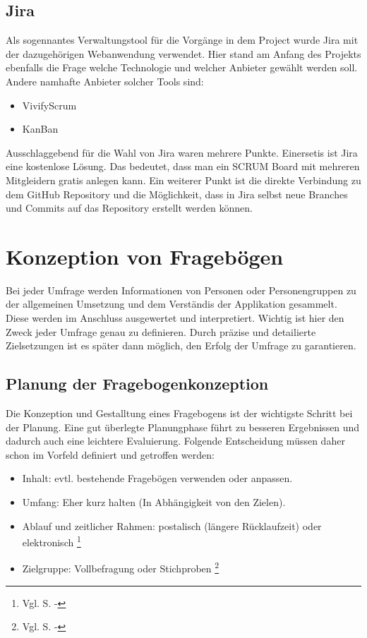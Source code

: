 \subsection{Jira}
Als sogennantes Verwaltungstool für die Vorgänge in dem Project wurde Jira mit der dazugehörigen
Webanwendung verwendet. Hier stand am Anfang des Projekts ebenfalls die Frage welche Technologie
und welcher Anbieter gewählt werden soll. Andere namhafte Anbieter solcher Tools sind:
\begin{itemize}
    \item VivifyScrum
    \item KanBan
\end{itemize}
Ausschlaggebend für die Wahl von Jira waren mehrere Punkte. Einersetis ist Jira eine kostenlose
Lösung. Das bedeutet, dass man ein SCRUM Board mit mehreren Mitgleidern gratis anlegen kann.
Ein weiterer Punkt ist die direkte Verbindung zu dem GitHub Repository und die Möglichkeit,
dass in Jira selbst neue Branches und Commits auf das Repository erstellt werden können.

\section{Konzeption von Fragebögen}
Bei jeder Umfrage werden Informationen von Personen oder Personengruppen zu der allgemeinen
Umsetzung und dem Verständis der Applikation gesammelt. Diese werden im Anschluss ausgewertet und
interpretiert. Wichtig ist hier den Zweck jeder Umfrage genau zu definieren. Durch präzise und
detailierte Zielsetzungen ist es später dann möglich, den Erfolg der Umfrage zu garantieren.

\subsection{Planung der Fragebogenkonzeption}
Die Konzeption und Gestalltung eines Fragebogens ist der wichtigste Schritt bei der Planung.
Eine gut überlegte Planungphase führt zu besseren Ergebnissen und dadurch auch eine leichtere
Evaluierung. Folgende Entscheidung müssen daher schon im Vorfeld definiert und getroffen werden:
\begin{itemize}
    \item Inhalt: evtl. bestehende Fragebögen verwenden oder anpassen.
    \item Umfang: Eher kurz halten (In Abhängigkeit von den Zielen).
    \item Ablauf und zeitlicher Rahmen: postalisch (längere Rücklaufzeit) oder elektronisch \footnote{Vgl. \cite{Buehner} S. -}
    \item Zielgruppe: Vollbefragung oder Stichproben \footnote{Vgl. \cite{Mayer} S. -}
\end{itemize}

